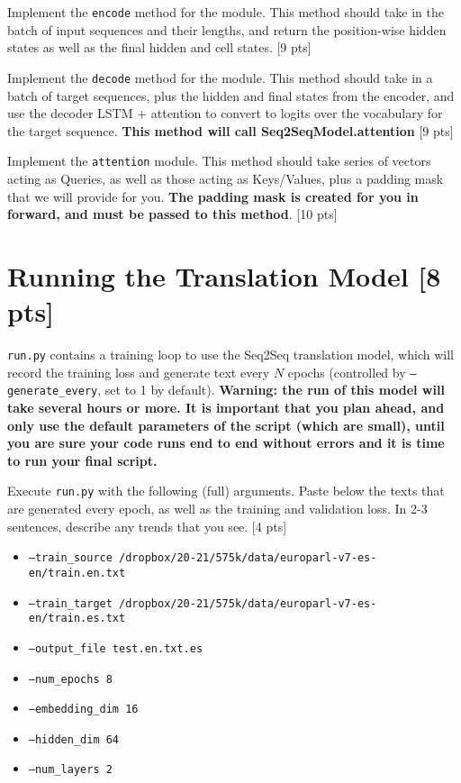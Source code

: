 \documentclass[11pt]{article}
\begin{document}
\vspace{2em}
 Implement the \texttt{encode} method for the module. This method should take in the batch of input sequences and their lengths, and return the position-wise hidden states as well as the final hidden and cell states. \hfill [9 pts]

\vspace{2em}
 Implement the \texttt{decode} method for the module. This method should take in a batch of target sequences, plus the hidden and final states from the encoder, and use the decoder LSTM + attention to convert to logits over the vocabulary for the target sequence. \textbf{This method will call Seq2SeqModel.attention} \hfill [9 pts]

\vspace{2em}
 Implement the \texttt{attention} module. This method should take series of vectors acting as Queries, as well as those acting as Keys/Values, plus a padding mask that we will provide for you. \textbf{The padding mask is created for you in forward, and must be passed to this method}. \hfill [10 pts]

\section{Running the Translation Model [8 pts]}

\texttt{run.py} contains a training loop to use the Seq2Seq translation model, which will record the training loss and generate text every $N$ epochs (controlled by \texttt{--generate\_every}, set to 1 by default). \textbf{Warning: the run of this model will take several hours or more. It is important that you plan ahead, and only use the default parameters of the script (which are small), until you are sure your code runs end to end without errors and it is time to run your final script.}

\vspace{2em}
  Execute \texttt{run.py} with the following (full) arguments. Paste below the texts that are generated every epoch, as well as the training and validation loss.  In 2-3 sentences, describe any trends that you see. \hfill [4 pts]
\begin{itemize}
    \item \texttt{--train\_source /dropbox/20-21/575k/data/europarl-v7-es-en/train.en.txt}
    \item \texttt{--train\_target /dropbox/20-21/575k/data/europarl-v7-es-en/train.es.txt}
    \item \texttt{--output\_file test.en.txt.es}
    \item \texttt{--num\_epochs 8}
    \item \texttt{--embedding\_dim 16}
    \item \texttt{--hidden\_dim 64}
    \item \texttt{--num\_layers 2}
\end{itemize}
\end{document}
